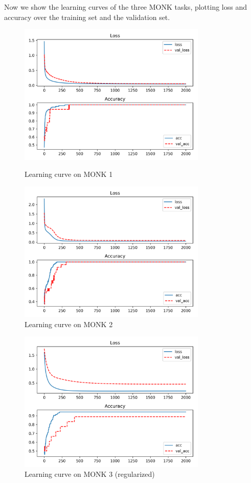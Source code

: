 Now we show the learning curves of the three MONK tasks, plotting loss and accuracy over the training set and the validation set.

\begin{figure}
    
    \label{fig:monk12}
    \begin{center}
        \includegraphics[width=0.8\textwidth]{monks1}
        \caption{Learning curve on MONK 1}
        \includegraphics[width=0.8\textwidth]{monks2}
        \caption{Learning curve on MONK 2}
    \end{center}
\end{figure}


\begin{figure}
    \caption{Learning curve on MONK 3 (regularized)}
    \label{fig:monk3}
    \begin{center}
        \includegraphics[width=0.8\textwidth]{monks3}
    \end{center}
\end{figure}

